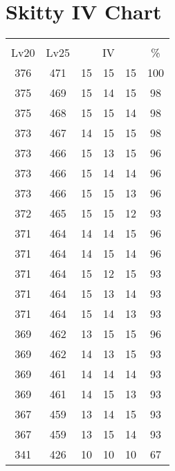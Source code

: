 \documentclass{article}%
\begin{document}
%
\normalsize%
\section{Skitty IV Chart}%
\label{sec:Skitty IV Chart}%
\renewcommand{\arraystretch}{1.5}%
\begin{tabular}{|c|c|c|c|c|c|}%
\hline%
\multicolumn{6}{|c|}{\textcolor{white}{ 
\linebreak{Skitty}
}%
\cellcolor{black}}\\%
\multicolumn{1}{|c}{Lv20}&\multicolumn{1}{c|}{Lv25}&\multicolumn{3}{c|}{IV}&\multicolumn{1}{|c|}{\%}\\%
\hline%
\rowcolor{color100}%
376&471&15&15&15&100\\%
\hline%
\rowcolor{color98}%
375&469&15&14&15&98\\%
\hline%
\rowcolor{color98}%
375&468&15&15&14&98\\%
\hline%
\rowcolor{color98}%
373&467&14&15&15&98\\%
\hline%
\rowcolor{color96}%
373&466&15&13&15&96\\%
\hline%
\rowcolor{color96}%
373&466&15&14&14&96\\%
\hline%
\rowcolor{color96}%
373&466&15&15&13&96\\%
\hline%
\rowcolor{color93}%
372&465&15&15&12&93\\%
\hline%
\rowcolor{color96}%
371&464&14&14&15&96\\%
\hline%
\rowcolor{color96}%
371&464&14&15&14&96\\%
\hline%
\rowcolor{color93}%
371&464&15&12&15&93\\%
\hline%
\rowcolor{color93}%
371&464&15&13&14&93\\%
\hline%
\rowcolor{color93}%
371&464&15&14&13&93\\%
\hline%
\rowcolor{color96}%
369&462&13&15&15&96\\%
\hline%
\rowcolor{color93}%
369&462&14&13&15&93\\%
\hline%
\rowcolor{color93}%
369&461&14&14&14&93\\%
\hline%
\rowcolor{color93}%
369&461&14&15&13&93\\%
\hline%
\rowcolor{color93}%
367&459&13&14&15&93\\%
\hline%
\rowcolor{color93}%
367&459&13&15&14&93\\%
\hline%
\rowcolor{color91}%
341&426&10&10&10&67\\%
\end{tabular}

%
\end{document}
